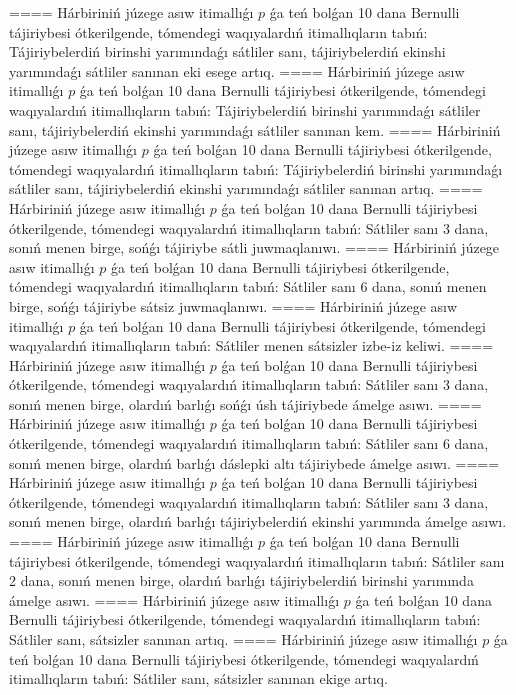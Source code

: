 ====
Hárbiriniń júzege asıw itimallıǵı $p$ ǵa teń bolǵan 10 dana Bernulli tájiriybesi ótkerilgende, tómendegi waqıyalardıń itimallıqların tabıń: Tájiriybelerdiń birinshi yarımındaǵı sátliler sanı, tájiriybelerdiń ekinshi yarımındaǵı sátliler sanınan eki esege artıq.
====
Hárbiriniń júzege asıw itimallıǵı $p$ ǵa teń bolǵan 10 dana Bernulli tájiriybesi ótkerilgende, tómendegi waqıyalardıń itimallıqların tabıń: Tájiriybelerdiń birinshi yarımındaǵı sátliler sanı, tájiriybelerdiń ekinshi yarımındaǵı sátliler sanınan kem.
====
Hárbiriniń júzege asıw itimallıǵı $p$ ǵa teń bolǵan 10 dana Bernulli tájiriybesi ótkerilgende, tómendegi waqıyalardıń itimallıqların tabıń: Tájiriybelerdiń birinshi yarımındaǵı sátliler sanı, tájiriybelerdiń ekinshi yarımındaǵı sátliler sanınan artıq.
====
Hárbiriniń júzege asıw itimallıǵı $p$ ǵa teń bolǵan 10 dana Bernulli tájiriybesi ótkerilgende, tómendegi waqıyalardıń itimallıqların tabıń: Sátliler sanı 3 dana, sonıń menen birge, sońǵı tájiriybe sátli juwmaqlanıwı.
====
Hárbiriniń júzege asıw itimallıǵı $p$ ǵa teń bolǵan 10 dana Bernulli tájiriybesi ótkerilgende, tómendegi waqıyalardıń itimallıqların tabıń: Sátliler sanı 6 dana, sonıń menen birge, sońǵı tájiriybe sátsiz juwmaqlanıwı.
====
Hárbiriniń júzege asıw itimallıǵı $p$ ǵa teń bolǵan 10 dana Bernulli tájiriybesi ótkerilgende, tómendegi waqıyalardıń itimallıqların tabıń: Sátliler menen sátsizler izbe-iz keliwi.
====
Hárbiriniń júzege asıw itimallıǵı $p$ ǵa teń bolǵan 10 dana Bernulli tájiriybesi ótkerilgende, tómendegi waqıyalardıń itimallıqların tabıń: Sátliler sanı 3 dana, sonıń menen birge, olardıń barlıǵı sońǵı úsh tájiriybede ámelge asıwı.
====
Hárbiriniń júzege asıw itimallıǵı $p$ ǵa teń bolǵan 10 dana Bernulli tájiriybesi ótkerilgende, tómendegi waqıyalardıń itimallıqların tabıń: Sátliler sanı 6 dana, sonıń menen birge, olardıń barlıǵı dáslepki altı tájiriybede ámelge asıwı.
====
Hárbiriniń júzege asıw itimallıǵı $p$ ǵa teń bolǵan 10 dana Bernulli tájiriybesi ótkerilgende, tómendegi waqıyalardıń itimallıqların tabıń: Sátliler sanı 3 dana, sonıń menen birge, olardıń barlıǵı tájiriybelerdiń ekinshi yarımında ámelge asıwı.
====
Hárbiriniń júzege asıw itimallıǵı $p$ ǵa teń bolǵan 10 dana Bernulli tájiriybesi ótkerilgende, tómendegi waqıyalardıń itimallıqların tabıń: Sátliler sanı 2 dana, sonıń menen birge, olardıń barlıǵı tájiriybelerdiń birinshi yarımında ámelge asıwı.
====
Hárbiriniń júzege asıw itimallıǵı $p$ ǵa teń bolǵan 10 dana Bernulli tájiriybesi ótkerilgende, tómendegi waqıyalardıń itimallıqların tabıń: Sátliler sanı, sátsizler sanınan artıq.
====
Hárbiriniń júzege asıw itimallıǵı $p$ ǵa teń bolǵan 10 dana Bernulli tájiriybesi ótkerilgende, tómendegi waqıyalardıń itimallıqların tabıń: Sátliler sanı, sátsizler sanınan ekige artıq.
